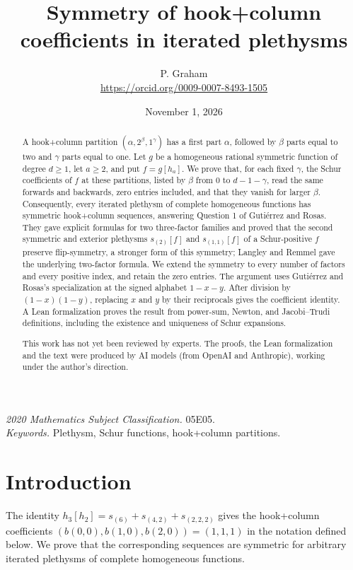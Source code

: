 \documentclass[11pt]{article}
\title{Symmetry of hook+column coefficients in iterated plethysms}
\author{P. Graham\\ \small\url{https://orcid.org/0009-0007-8493-1505}}
\date{November 1, 2026}
\begin{document}
\maketitle
\begin{abstract}
A hook+column partition $(\alpha,2^\beta,1^\gamma)$ has a first part $\alpha$, followed by $\beta$ parts equal to two and $\gamma$ parts equal to one. Let $g$ be a homogeneous rational symmetric function of degree $d\geq1$, let $a\geq2$, and put $f=g[h_a]$. We prove that, for each fixed $\gamma$, the Schur coefficients of $f$ at these partitions, listed by $\beta$ from $0$ to $d-1-\gamma$, read the same forwards and backwards, zero entries included, and that they vanish for larger $\beta$. Consequently, every iterated plethysm of complete homogeneous functions has symmetric hook+column sequences, answering Question 1 of Gutiérrez and Rosas. They gave explicit formulas for two three-factor families and proved that the second symmetric and exterior plethysms $s_{(2)}[f]$ and $s_{(1,1)}[f]$ of a Schur-positive $f$ preserve flip-symmetry, a stronger form of this symmetry; Langley and Remmel gave the underlying two-factor formula. We extend the symmetry to every number of factors and every positive index, and retain the zero entries. The argument uses Gutiérrez and Rosas's specialization at the signed alphabet $1-x-y$. After division by $(1-x)(1-y)$, replacing $x$ and $y$ by their reciprocals gives the coefficient identity. A Lean formalization proves the result from power-sum, Newton, and Jacobi--Trudi definitions, including the existence and uniqueness of Schur expansions.

This work has not yet been reviewed by experts. The proofs, the Lean formalization and the text were produced by AI models (from OpenAI and Anthropic), working under the author's direction.
\end{abstract}
\medskip
\noindent\textit{2020 Mathematics Subject Classification.} 05E05.\\
\textit{Keywords.} Plethysm, Schur functions, hook+column partitions.

\section{Introduction}
The identity $h_3[h_2]=s_{(6)}+s_{(4,2)}+s_{(2,2,2)}$ gives the hook+column coefficients $(b(0,0),b(1,0),b(2,0))=(1,1,1)$ in the notation defined below. We prove that the corresponding sequences are symmetric for arbitrary iterated plethysms of complete homogeneous functions.
\end{document}
